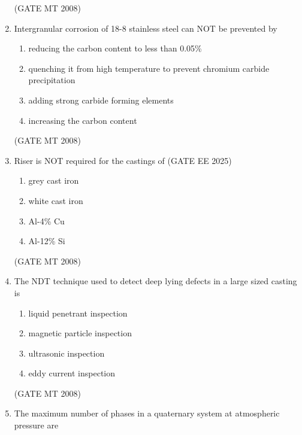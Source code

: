 \documentclass[11pt, letterpaper]{article}
\theoremstyle{remark}
\begin{document}
\begin{enumerate}
\hfill(GATE MT 2008)

\item Intergranular corrosion of 18-8 stainless steel can NOT be prevented by

\begin{multicols}{1}
\begin{enumerate}
\item reducing the carbon content to less than 0.05\%
\item quenching it from high temperature to prevent chromium carbide precipitation 
\item adding strong carbide forming elements
\item increasing the carbon content
\end{enumerate}
\end{multicols}

\hfill(GATE MT 2008)

\item Riser is NOT required for the castings of \hfill (GATE EE 2025)

\begin{multicols}{4}
\begin{enumerate}
\item grey cast iron
\item white cast iron 
\item Al-4\% Cu
\item Al-12\% Si
\end{enumerate}
\end{multicols}

\hfill(GATE MT 2008)

\item The NDT technique used to detect deep lying defects in a large sized casting is

\begin{multicols}{2}
\begin{enumerate}
\item liquid penetrant inspection
\item magnetic particle inspection
\item ultrasonic inspection
\item eddy current inspection
\end{enumerate}
\end{multicols}

\hfill(GATE MT 2008)

\item The maximum number of phases in a quaternary system at atmospheric pressure are


\end{enumerate}
\end{document}
